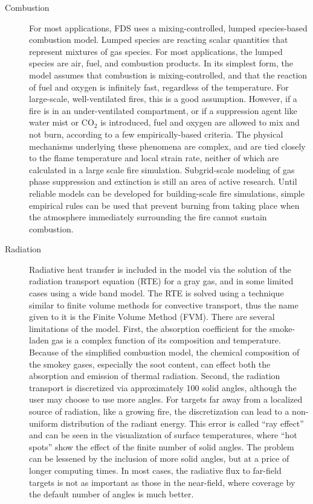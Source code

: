 \documentclass[11pt]{book}
\begin{document}
\begin{description}
\item[Combustion] For most applications, FDS uses a mixing-controlled, lumped species-based combustion model. Lumped species are reacting scalar quantities that represent mixtures of gas species.  For most applications, the lumped species are air, fuel, and combustion products.  In its simplest form, the model assumes that combustion is mixing-controlled, and that the reaction of fuel and oxygen is infinitely fast, regardless of the temperature. For large-scale, well-ventilated fires, this is a good assumption. However, if a fire is in an under-ventilated compartment, or if a suppression agent like water mist or CO$_2$ is introduced, fuel and oxygen are allowed to mix and not burn, according to a few empirically-based criteria. The physical mechanisms underlying these phenomena are complex, and are tied closely to the flame temperature and local strain rate, neither of which are calculated in a large scale fire simulation. Subgrid-scale modeling of gas phase suppression and extinction is still an area of active research. Until reliable models can be developed for building-scale fire simulations, simple empirical rules can be used that prevent burning from taking place when the atmosphere immediately surrounding the fire cannot sustain combustion.
\item[Radiation] Radiative heat transfer is included in the model via the solution of the radiation transport equation (RTE) for a gray gas, and in some limited cases using a wide band model.  The RTE is solved using a technique similar to finite volume methods for convective transport, thus the name given to it is the Finite Volume Method (FVM). There are several limitations of the model. First, the absorption coefficient for the smoke-laden gas is a complex function of its composition and temperature. Because of the simplified combustion model, the chemical composition of the smokey gases, especially the soot content, can effect both the absorption and emission of thermal radiation.  Second, the radiation transport is discretized via approximately 100 solid angles, although the user may choose to use more angles. For targets far away from a localized source of radiation, like a growing fire, the discretization can lead to a non-uniform distribution of the radiant energy. This error is called ``ray effect'' and can be seen in the visualization of surface temperatures, where ``hot spots'' show the effect of the finite number of solid angles. The problem can be lessened by the inclusion of more solid angles, but at a price of longer computing times. In most cases, the radiative flux to far-field targets is not as important as those in the near-field, where coverage by the default number of angles is much better.
\end{description}
\end{document}
